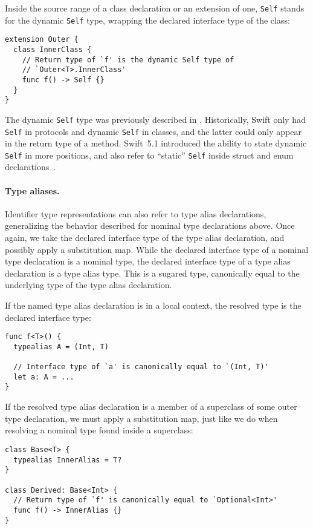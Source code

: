 \documentclass[../generics]{subfiles}
\begin{document}
Inside the source range of a class declaration or an extension of one, \texttt{Self} stands for the dynamic \texttt{Self} type, wrapping the declared interface type of the class:
\begin{Verbatim}
extension Outer {
  class InnerClass {
    // Return type of `f' is the dynamic Self type of
    // `Outer<T>.InnerClass'
    func f() -> Self {}
  }
}
\end{Verbatim}

The dynamic \texttt{Self} type was previously described in . Historically, Swift only had \texttt{Self} in protocols and dynamic \texttt{Self} in classes, and the latter could only appear in the return type of a method. Swift~5.1 introduced the ability to state dynamic \texttt{Self} in more positions, and also refer to ``static'' \texttt{Self} inside struct and enum declarations~\cite{se0068}.

\paragraph{Type aliases.}
Identifier type representations can also refer to type alias declarations, generalizing the behavior described for nominal type declarations above. Once again, we take the declared interface type of the type alias declaration, and possibly apply a substitution map. While the declared interface type of a nominal type declaration is a nominal type, the declared interface type of a type alias declaration is a type alias type. This is a sugared type, canonically equal to the underlying type of the type alias declaration.

If the named type alias declaration is in a local context, the resolved type is the declared interface type:
\begin{Verbatim}
func f<T>() {
  typealias A = (Int, T)

  // Interface type of `a' is canonically equal to `(Int, T)'
  let a: A = ...
}
\end{Verbatim}

If the resolved type alias declaration is a member of a superclass of some outer type declaration, we must apply a substitution map, just like we do when resolving a nominal type found inside a superclass:
\begin{Verbatim}
class Base<T> {
  typealias InnerAlias = T?
}

class Derived: Base<Int> {
  // Return type of `f' is canonically equal to `Optional<Int>'
  func f() -> InnerAlias {}
}
\end{Verbatim}
\end{document}
